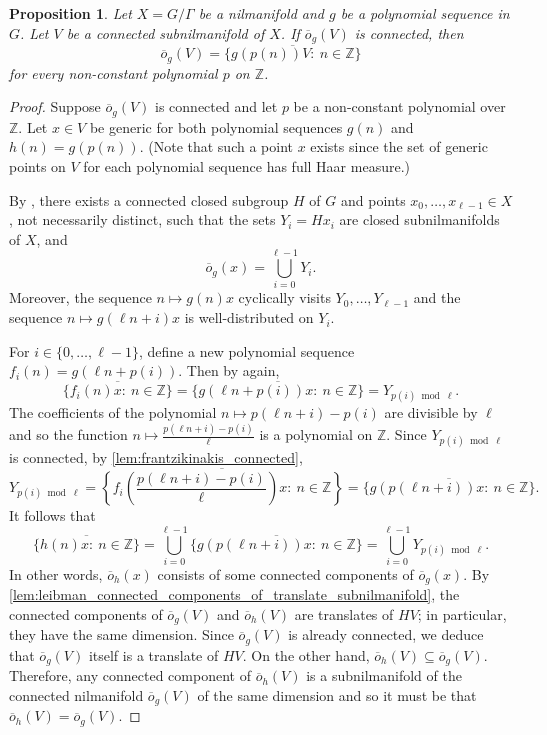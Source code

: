 \documentclass{article}
\theoremstyle{plain}
\newtheorem{proposition}[Theorem]{Proposition}
\theoremstyle{claim}
\theoremstyle{definition}
\theoremstyle{plain}
\theoremstyle{plain}
\newcommand{\Z}{\mathbb{Z}}
\newcommand{\1}{\boldsymbol{1}}
\newcommand{\orb}{\overline{o}}
\begin{document}
\begin{proposition}\label{prop:orbit_closure_subnil_arith_same}
Let $X = G/\Gamma$ be a nilmanifold and $g$ be a polynomial sequence in $G$. Let $V$ be a connected subnilmanifold of $X$. If $\orb_g(V)$ is connected, then
\[
    \orb_g(V) = \overline{\{g(p(n)) V: \ n \in \Z\}}
\]
for every non-constant polynomial $p$ on $\Z$.
\end{proposition}
\begin{proof}
Suppose $\orb_g(V)$ is connected and let $p$ be a non-constant polynomial over $\Z$.
Let $x \in V$ be generic for both polynomial sequences $g(n)$ and $h(n) = g(p(n))$. (Note that such a point $x$ exists since the set of generic points on $V$ for each polynomial sequence has full Haar measure.) 


By \cite[Theorem B]{Leibman05a}, there exists a connected closed subgroup $H$ of $G$ and points $x_0, \ldots, x_{\ell-1} \in X$, not necessarily distinct, such that the sets $Y_i = H x_i$ are closed subnilmanifolds of $X$, and
\[
    \orb_g(x) = \bigcup_{i=0}^{\ell-1} Y_i.
\]
Moreover, the sequence $n \mapsto g(n) x$ cyclically visits $Y_0, \ldots, Y_{\ell-1}$ and the sequence $n \mapsto g(\ell n + i)x$ is well-distributed on $Y_i$. 

For $i \in \{0, \ldots, \ell - 1\}$, define a new polynomial sequence $f_i(n) = g(\ell n + p(i))$. Then by \cite[Theorem~B]{Leibman05a} again, 
\[
    \overline{\{f_i(n) x: \ n \in \Z\}} = \overline{\{g(\ell n + p(i)) x: \ n \in \Z\}} = Y_{p(i) \bmod \ell}. 
\]
The coefficients of the polynomial $n \mapsto p(\ell n + i) - p(i)$ are divisible by $\ell$ and so the function $n \mapsto \frac{p(\ell n + i) - p(i)}{\ell}$ is a polynomial on $\Z$.
Since $Y_{p(i) \bmod \ell}$ is connected, by \cref{lem:frantzikinakis_connected}, 
\[
    Y_{p(i) \bmod \ell} = \overline{
    \left\{f_i\left(\frac{p(\ell n + i) - p(i)}{\ell} \right)x : \ n \in \Z\right\}} = \overline{\{g(p(\ell n + i))x: \ n \in \Z\}}.
\]
It follows that 
\[
    \overline{\{h(n) x: \ n \in \Z\}} = \bigcup_{i=0}^{\ell - 1} \overline{\{g(p(\ell n + i))x: \ n \in \Z\}} = \bigcup_{i=0}^{\ell-1} Y_{p(i) \bmod \ell}.
\]
In other words, $\orb_h(x)$ consists of some connected components of $\orb_g(x)$.
By \cref{lem:leibman_connected_components_of_translate_subnilmanifold}, the connected components of $\orb_g(V)$ and $\orb_h(V)$ are  translates of $HV$; in particular, they have the same dimension. Since $\orb_g(V)$ is already connected, we deduce that $\orb_g(V)$ itself is a translate of $HV$.  
On the other hand, $\orb_h(V) \subseteq \orb_g(V)$. Therefore, any connected component of $\orb_h(V)$ is a subnilmanifold of the connected nilmanifold $\orb_g(V)$ of the same dimension and so it must be that $\orb_h(V) = \orb_g(V)$. 
\end{proof}
\end{document}
